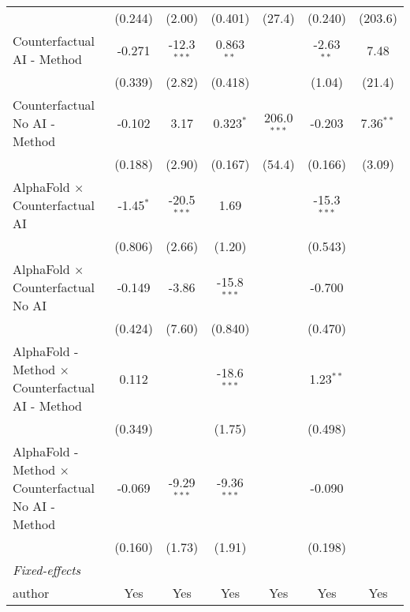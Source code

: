 \begin{tabular}{lcccccc}
                                                              & (0.244)     & (2.00)        & (0.401)       & (27.4)         & (0.240)       & (203.6)\\   
   Counterfactual AI - Method                                 & -0.271      & -12.3$^{***}$ & 0.863$^{**}$  &                & -2.63$^{**}$  & 7.48\\   
                                                              & (0.339)     & (2.82)        & (0.418)       &                & (1.04)        & (21.4)\\   
   Counterfactual No AI - Method                              & -0.102      & 3.17          & 0.323$^{*}$   & 206.0$^{***}$  & -0.203        & 7.36$^{**}$\\   
                                                              & (0.188)     & (2.90)        & (0.167)       & (54.4)         & (0.166)       & (3.09)\\   
   AlphaFold $\times$ Counterfactual AI                       & -1.45$^{*}$ & -20.5$^{***}$ & 1.69          &                & -15.3$^{***}$ &   \\   
                                                              & (0.806)     & (2.66)        & (1.20)        &                & (0.543)       &   \\   
   AlphaFold $\times$ Counterfactual No AI                    & -0.149      & -3.86         & -15.8$^{***}$ &                & -0.700        &   \\   
                                                              & (0.424)     & (7.60)        & (0.840)       &                & (0.470)       &   \\   
   AlphaFold - Method $\times$ Counterfactual AI - Method     & 0.112       &               & -18.6$^{***}$ &                & 1.23$^{**}$   &   \\   
                                                              & (0.349)     &               & (1.75)        &                & (0.498)       &   \\   
   AlphaFold - Method $\times$ Counterfactual No AI - Method  & -0.069      & -9.29$^{***}$ & -9.36$^{***}$ &                & -0.090        &   \\   
                                                              & (0.160)     & (1.73)        & (1.91)        &                & (0.198)       &   \\   
   \midrule
   \emph{Fixed-effects}\\
   author                                                     & Yes         & Yes           & Yes           & Yes            & Yes           & Yes\\  

\end{tabular}
